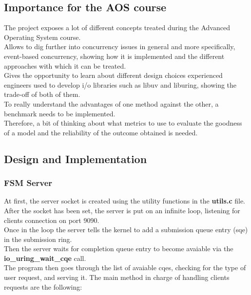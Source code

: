 \subsection{Importance for the AOS course}

The project exposes a lot of different concepts treated during the Advanced Operating System course. \\
Allows to dig further into concurrency issues in general and more specifically, event-based concurrency, showing how it is implemented and the different approaches with which it can be treated. \\
Gives the opportunity to learn about different design choices experienced engineers used to develop i/o libraries such as libuv and liburing, showing the trade-off of both of them. \\
To really understand the advantages of one method against the other, a benchmark needs to be implemented. \\
Therefore, a bit of thinking about what metrics to use to evaluate the goodness of a model and the reliability of the outcome obtained is needed.

\subsection{Design and Implementation}

\subsubsection{FSM Server}
At first, the server socket is created using the utility functions in the \textbf{utils.c} file. \\
After the socket has been set, the server is put on an infinite loop, listening for clients connection on port 9090. \\
Once in the loop the server tells the kernel to add a submission queue entry (sqe) in the submission ring. \\
Then the server waits for completion queue entry to become avaiable via the \textbf{io\_uring\_wait\_cqe} call. \\
The program then goes through the list of avaiable cqes, checking for the type of user request, and serving it.
The main method in charge of handling clients requests are the following:

